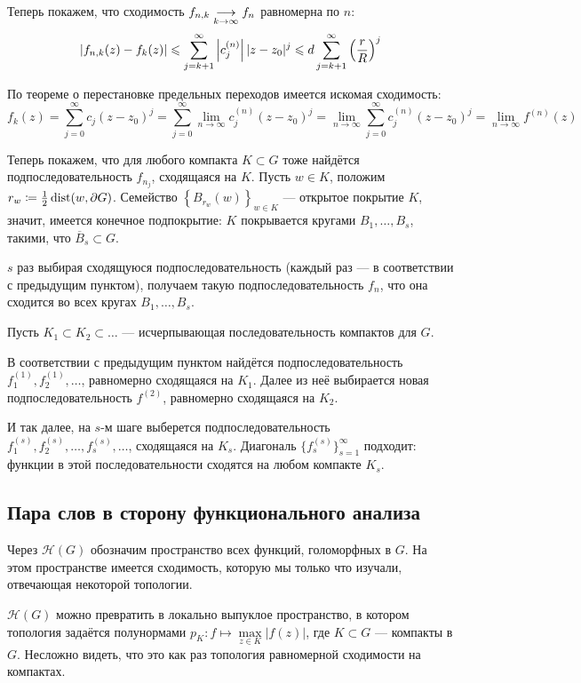 \documentclass[a4paper]{report}
\begin{document}
{{{{    Теперь покажем, что сходимость $f_{n,k} \underset{k \to \infty}{\longrightarrow} f_n$ равномерна по $n$:
    \[\left|f_{n,k}(z) - f_k(z)\right| \leqslant \sum\limits_{j = k + 1}^{\infty}\left|c_j^{(n)}\right||z - z_0|^j \leqslant d\sum\limits_{j = k + 1}^{\infty}\left(\frac{r}{R}\right)^j\]
    \item По теореме о перестановке предельных переходов имеется искомая сходимость: \[f_k(z) = \sum\limits_{j = 0}^{\infty}c_j (z - z_0)^{j} = \sum\limits_{j = 0}^{\infty}\lim\limits_{n \to \infty}c_j^{(n)} (z - z_0)^{j} = \lim\limits_{n \to \infty}\sum\limits_{j = 0}^{\infty}c_j^{(n)} (z - z_0)^{j} = \lim\limits_{n \to \infty} f^{(n)}(z)\]
    }
    \item Теперь покажем, что для любого компакта $K \subset G$ тоже найдётся подпоследовательность $f_{n_j}$, сходящаяся на $K$.
    Пусть $w \in K$, положим $r_w \coloneqq \frac{1}{2}\operatorname{dist}(w, \partial G)$.
        Семейство $\left\{B_{r_w}(w)\right\}_{w \in K}$ --- открытое покрытие $K$, значит, имеется конечное подпокрытие: $K$ покрывается кругами $B_1, \dots, B_s$, такими, что $\overline{B}_s \subset G$.

    $s$ раз выбирая сходящуюся подпоследовательность (каждый раз --- в соответствии с предыдущим пунктом), получаем такую подпоследовательность $f_n$, что она сходится во всех кругах $B_1, \dots, B_s$.
    \item Пусть $K_1 \subset K_2 \subset \dots$ --- исчерпывающая последовательность компактов для $G$.

    В соответствии с предыдущим пунктом найдётся подпоследовательность $f_1^{(1)}, f_2^{(1)}, \dots$, равномерно сходящаяся на $K_1$.
    Далее из неё выбирается новая подпоследовательность $f^{(2)}$, равномерно сходящаяся на $K_2$.

    И так далее, на $s$-м шаге выберется подпоследовательность $f^{(s)}_1, f^{(s)}_2, \dots, f^{(s)}_s, \dots$, сходящаяся на $K_s$.
    Диагональ $\{f_s^{(s)}\}_{s = 1}^{\infty}$ подходит: функции в этой последовательности сходятся на любом компакте $K_s$.\qedhere
    }
    }
    }
    \subsection{Пара слов в сторону функционального анализа}
    Через $\mathcal{H}(G)$ обозначим пространство всех функций, голоморфных в $G$.
    На этом пространстве имеется сходимость, которую мы только что изучали, отвечающая некоторой топологии.

    $\mathcal{H}(G)$ можно превратить в локально выпуклое пространство, в котором топология задаётся полунормами $p_K: f \mapsto \max\limits_{z \in K}|f(z)|$, где $K \subset G$ --- компакты в $G$.
    Несложно видеть, что это как раз топология равномерной сходимости на компактах.
\end{document}
